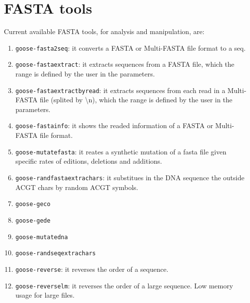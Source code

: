 \chapter{FASTA tools}
\label{fasta}

Current available FASTA tools, for analysis and manipulation, are:
\begin{enumerate}
\item \texttt{goose-fasta2seq}: it converts a FASTA or Multi-FASTA file format to a seq.
\item \texttt{goose-fastaextract}: it extracts sequences from a FASTA file, which the range is defined by the user in the parameters.
\item \texttt{goose-fastaextractbyread}: it extracts sequences from each read in a Multi-FASTA file (splited by \textbackslash n), which the range is defined by the user in the parameters.
\item \texttt{goose-fastainfo}: it shows the readed information of a FASTA or Multi-FASTA file format.
\item \texttt{goose-mutatefasta}: it reates a synthetic mutation of a fasta file given specific rates of editions, deletions and additions.
\item \texttt{goose-randfastaextrachars}: it substitues in the DNA sequence the outside ACGT chars by random ACGT symbols.
\item \texttt{goose-geco}
\item \texttt{goose-gede}
\item \texttt{goose-mutatedna}
\item \texttt{goose-randseqextrachars}
\item \texttt{goose-reverse}: it reverses the order of a sequence.
\item \texttt{goose-reverselm}: it reverses the order of a large sequence. Low memory usage for large files.
\end{enumerate}




 


%
%
%
%
%
%